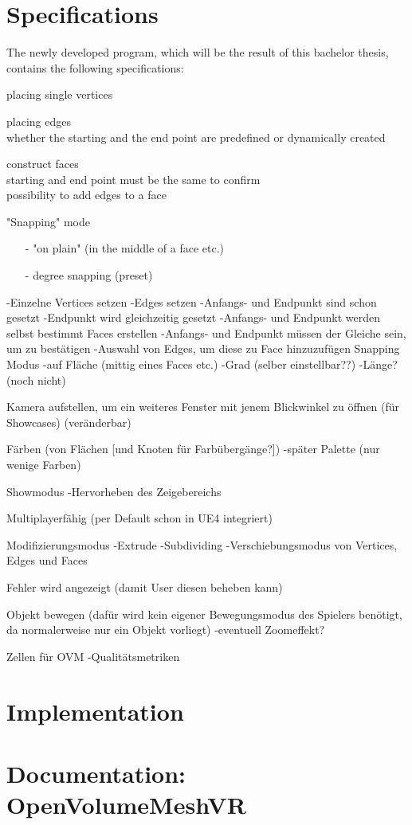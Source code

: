 \documentclass{report}
\begin{document}
\chapter{Specifications}
	The newly developed program, which will be the result of this bachelor thesis, contains the following specifications:
	\begin{description}
		\item placing single vertices
		\item placing edges \\
			whether the starting and the end point are predefined or dynamically created
		\item construct faces \\
			starting and end point must be the same to confirm \\
			possibility to add edges to a face
		\item "Snapping" mode \\
			\begin{itemize}
				\setlength{\itemsep}{0pt}
				\item[-] "on plain" (in the middle of a face etc.) \\
				\item[-] degree snapping (preset)
			\end{itemize}
	\end{description}
	-Einzelne Vertices setzen
	-Edges setzen
		-Anfangs- und Endpunkt sind schon gesetzt
		-Endpunkt wird gleichzeitig gesetzt
		-Anfangs- und Endpunkt werden selbst bestimmt
	Faces erstellen
		-Anfangs- und Endpunkt müssen der Gleiche sein, um zu bestätigen
		-Auswahl von Edges, um diese zu Face hinzuzufügen
	Snapping Modus
		-auf Fläche (mittig eines Faces etc.)
		-Grad (selber einstellbar??)
		-Länge? (noch nicht)
	
	Kamera aufstellen, um ein weiteres Fenster mit jenem Blickwinkel zu öffnen (für Showcases) (veränderbar)
	
	Färben (von Flächen [und Knoten für Farbübergänge?])
		-später Palette (nur wenige Farben)
	
	Showmodus
		-Hervorheben des Zeigebereichs
		
	Multiplayerfähig (per Default schon in UE4 integriert)
	
	Modifizierungsmodus
		-Extrude
		-Subdividing
		-Verschiebungsmodus von Vertices, Edges und Faces
	
	Fehler wird angezeigt (damit User diesen beheben kann)
		
	Objekt bewegen (dafür wird kein eigener Bewegungsmodus des Spielers benötigt, da normalerweise nur ein Objekt vorliegt)
		-eventuell Zoomeffekt?
		
	Zellen für OVM
		-Qualitätsmetriken
		
\chapter{Implementation}

\chapter{Documentation: OpenVolumeMeshVR}


\newpage
{}

\end{document}
